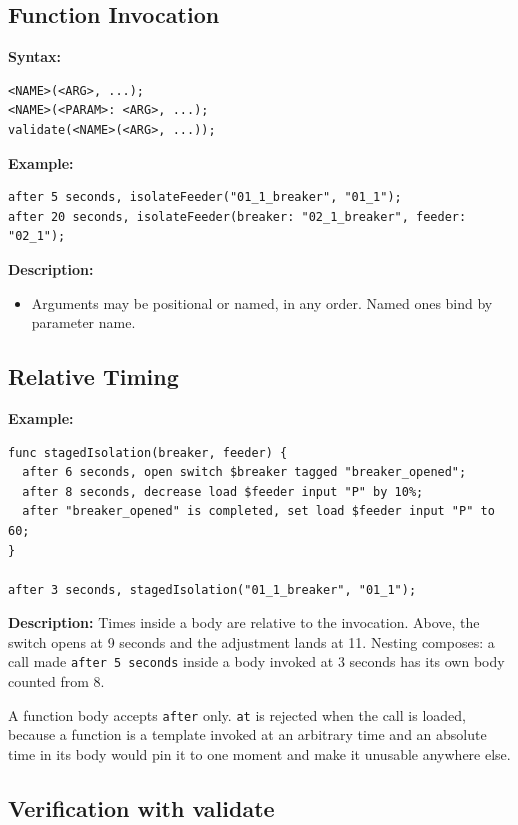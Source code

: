 \documentclass[12pt]{article}
\begin{document}
\subsection{Function Invocation}

\textbf{Syntax:}
\begin{lstlisting}
<NAME>(<ARG>, ...);
<NAME>(<PARAM>: <ARG>, ...);
validate(<NAME>(<ARG>, ...));
\end{lstlisting}

\textbf{Example:}
\begin{lstlisting}
after 5 seconds, isolateFeeder("01_1_breaker", "01_1");
after 20 seconds, isolateFeeder(breaker: "02_1_breaker", feeder: "02_1");
\end{lstlisting}

\textbf{Description:}
\begin{itemize}
  \item Arguments may be positional or named, in any order. Named ones bind by parameter name.
\end{itemize}

\subsection{Relative Timing}
\label{sec:relative_timing}

\textbf{Example:}
\begin{lstlisting}
func stagedIsolation(breaker, feeder) {
  after 6 seconds, open switch $breaker tagged "breaker_opened";
  after 8 seconds, decrease load $feeder input "P" by 10%;
  after "breaker_opened" is completed, set load $feeder input "P" to 60;
}

after 3 seconds, stagedIsolation("01_1_breaker", "01_1");
\end{lstlisting}

\textbf{Description:} Times inside a body are relative to the invocation. Above, the switch opens at 9 seconds and the adjustment lands at 11. Nesting composes: a call made \texttt{after 5 seconds} inside a body invoked at 3 seconds has its own body counted from 8.

A function body accepts \texttt{after} only. \texttt{at} is rejected when the call is loaded, because a function is a template invoked at an arbitrary time and an absolute time in its body would pin it to one moment and make it unusable anywhere else.

\subsection{Verification with validate}
\end{document}
